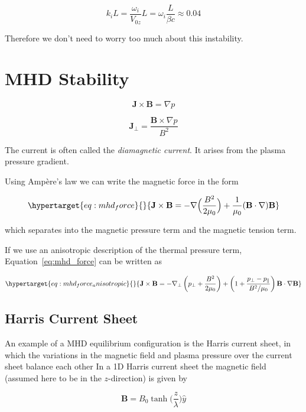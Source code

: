 \documentclass[
  notoc %
]{tufte-book}
\begin{document}
\[
k_i L =\frac{\omega_i}{V_{0z}}L = \omega_i \frac{L}{\beta c}\approx 0.04
\]

Therefore we don't need to worry too much about this instability.

\hypertarget{mhd-stability}{%
\section{MHD Stability}\label{mhd-stability}}

\[
\mathbf{J}\times\mathbf{B} = \nabla p
\]

\[
\mathbf{J}_\perp = \frac{\mathbf{B}\times\nabla p}{B^2}
\]

The current is often called the \emph{diamagnetic current}. It arises
from the plasma pressure gradient.

Using Ampère's law we can write the magnetic force in the form

\begin{equation}\protect\hypertarget{eq:mhd_force}{}{
\mathbf{J}\times\mathbf{B} = -\nabla\Big( \frac{B^2}{2\mu_0}\Big) + \frac{1}{\mu_0}(\mathbf{B}\cdot\nabla)\mathbf{B}
}\label{eq:mhd_force}\end{equation}

which separates into the magnetic pressure term and the magnetic tension
term.

If we use an anisotropic description of the thermal pressure term,
Equation~\ref{eq:mhd_force} can be written as

\begin{equation}\protect\hypertarget{eq:mhd_force_anisotropic}{}{
\mathbf{J}\times\mathbf{B} = -\nabla_\perp\left( p_\perp + \frac{B^2}{2\mu_0}\right) + \left( 1+\frac{p_\perp - p_\parallel}{B^2/\mu_0}\right)\mathbf{B}\cdot\nabla\mathbf{B}
}\label{eq:mhd_force_anisotropic}\end{equation}

\hypertarget{sec:harris_cs}{%
\subsection{Harris Current Sheet}\label{sec:harris_cs}}

An example of a MHD equilibrium configuration is the Harris current
sheet, in which the variations in the magnetic field and plasma pressure
over the current sheet balance each other In a 1D Harris current sheet
the magnetic field (assumed here to be in the \(z\)-direction) is given
by

\[
\mathbf{B} = B_0 \tanh\Big( \frac{z}{\lambda} \Big) \hat{y}
\]
\end{document}
